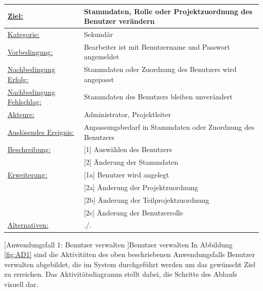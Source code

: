 \begin{tabularx}{\textwidth}{|p{}|p{}|}
        \hline
        \underline{Ziel:} & Stammdaten, Rolle oder Projektzuordnung des Benutzer verändern \\\hline
        \underline{Kategorie:} & Sekundär \\\hline
        \underline{Vorbedingung:} & Bearbeiter ist mit Benutzername und Passwort angemeldet \\\hline
        \underline{Nachbedingung Erfolg:} & Stammdaten oder Zuordnung des Benutzers wird angepasst \\\hline
        \underline{Nachbedingung Fehlschlag:} & Stammdaten des Benutzers bleiben unverändert \\\hline
        \underline{Akteure:} & Administrator, Projektleiter \\\hline
        \underline{Auslösendes Ereignis:} & Anpassungsbedarf in Stammdaten oder Zuordnung des Benutzers\\\hline        
        \multirow{1}{*}{\underline{Beschreibung:}} & [1] Auswählen des Benutzers \\
        & [2] Änderung der Stammdaten \\\hline
        \multirow{1}{*}{\underline{Erweiterung:}} & [1a] Benutzer wird angelegt \\
        & [2a] Änderung der Projektzuordnung \\
        & [2b] Änderung der Teilprojektzuordnung \\
        & [2c] Änderung der Benutzerrolle \\\hline
        \underline{Alternativen:} & ./. \\\hline
\end{tabularx}
[Anwendungsfall 1: Benutzer verwalten ]{Benutzer verwalten}
\newpage
In Abbildung \ref{fig:AD1} sind die Aktivitäten des oben beschriebenen Anwendungsfalls \glqq{}Benutzer verwalten\grqq{} abgebildet, die im System durchgeführt werden um das gewünscht Ziel zu erreichen. Das Aktivitätsdiagramm stellt dabei, die Schritte des Ablaufs visuell dar.
